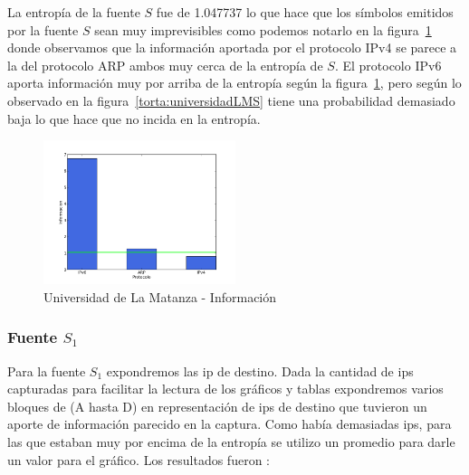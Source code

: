 \documentclass[final,inline,narroweqnarray,a4paper]{ieee}
\begin{document}
La entropía de la fuente $S$ fue de 1.047737 lo que hace que los símbolos emitidos por la fuente $S$ sean muy imprevisibles como podemos notarlo en la figura~\ref{histo:universidadLMS} donde observamos que la información aportada por el protocolo IPv4 se parece a la del protocolo ARP ambos muy cerca de la entropía de $S$. El protocolo IPv6 aporta información muy por arriba de la entropía según la figura~\ref{histo:universidadLMS}, pero según lo observado en la figura~\ref{torta:universidadLMS} tiene una probabilidad demasiado baja lo que hace que no incida en la entropía.

\begin{figure}[H]
    \begin{center}
        \includegraphics[width=0.5\textwidth]{plot/facultadS-bar.png}
        \caption{Universidad de La Matanza - Información}
        \label{histo:universidadLMS}
    \end{center}
\end{figure}

\subsubsection{Fuente $S_1$}

Para la fuente $S_1$ expondremos las ip de destino. Dada la cantidad de ips capturadas para facilitar la lectura de los gráficos y tablas expondremos varios bloques de (A hasta D) en representación de ips de destino que tuvieron un aporte de información parecido en la captura. Como había demasiadas ips, para las que estaban muy por encima de la entropía se utilizo un promedio para darle un valor para el gráfico. Los resultados fueron :
\end{document}
